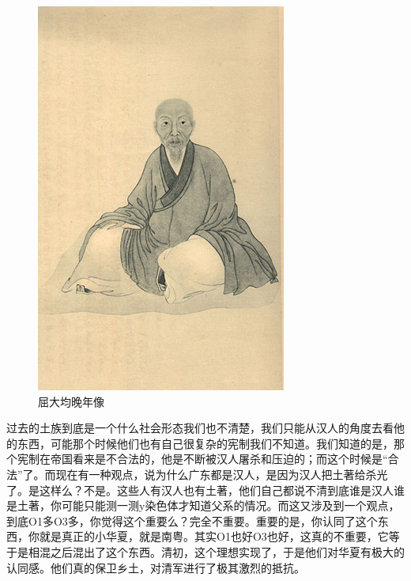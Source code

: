 \begin{figure}
	\centering
	\includegraphics[width=\textwidth]{images/image-61}
	\caption{屈大均晚年像}
\end{figure}

过去的土族到底是一个什么社会形态我们也不清楚，我们只能从汉人的角度去看他的东西，可能那个时候他们也有自己很复杂的宪制我们不知道。我们知道的是，那个宪制在帝国看来是不合法的，他是不断被汉人屠杀和压迫的；而这个时候是“合法”了。而现在有一种观点，说为什么广东都是汉人，是因为汉人把土著给杀光了。是这样么？不是。这些人有汉人也有土著，他们自己都说不清到底谁是汉人谁是土著，你可能只能测一测y染色体才知道父系的情况。而这又涉及到一个观点，到底O1多O3多，你觉得这个重要么？完全不重要。重要的是，你认同了这个东西，你就是真正的小华夏，就是南粤。其实O1也好O3也好，这真的不重要，它等于是相混之后混出了这个东西。清初，这个理想实现了，于是他们对华夏有极大的认同感。他们真的保卫乡土，对清军进行了极其激烈的抵抗。


